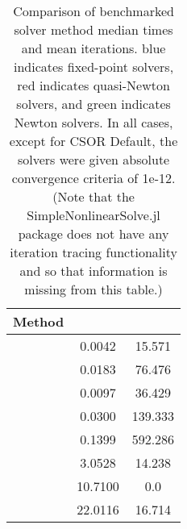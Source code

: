 \renewcommand{\arraystretch}{1.5}
\begin{table}[h!]
    \caption[Solver Benchmark Comparison.]{
    Comparison of benchmarked solver method median times and mean iterations.
    blue indicates fixed-point solvers, red indicates quasi-Newton solvers, and green indicates Newton solvers.
    In all cases, except for CSOR Default, the solvers were given absolute convergence criteria of 1e-12.
    (Note that the SimpleNonlinearSolve.jl package does not have any iteration tracing functionality and so that information is missing from this table.)
    }
    \begin{center}
        \begin{tabular}{ c | S[detect-weight,table-format=2.4] | S[detect-weight,table-format=3.3] }
        Method                                 & {}                 & {}              \\
        \hline
         & \color{primary} 0.0042 & \color{primary} 15.571 \\
         & \color{primary} 0.0183 & \color{primary} 76.476 \\
         & \color{primary} 0.0097 & \color{primary} 36.429 \\
         & \color{primary} 0.0300 & \color{primary} 139.333 \\
         & \color{primary} 0.1399 & \color{primary} 592.286 \\
         & \color{secondary}3.0528 & \color{secondary}14.238 \\
         & \color{tertiary} 10.7100 & \color{tertiary} \color{white} 0.0 \\
         & \color{tertiary} 22.0116 & \color{tertiary} 16.714 \\
        \end{tabular}
    \end{center}
    \label{tab:benchmarkcomp}
\end{table}


